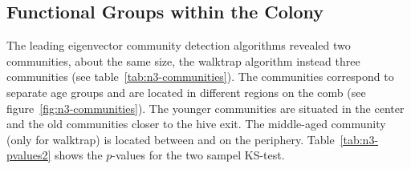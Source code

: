 \subsection{Functional Groups within the Colony}
The leading eigenvector community detection algorithms revealed two communities, about the same size, the walktrap algorithm instead three communities (see table~\ref{tab:n3-communities}).
The communities correspond to separate age groups and are located in different regions on the comb (see figure~\ref{fig:n3-communities}). The younger communities are situated in the center and the old communities closer to the hive exit. The middle-aged community (only for walktrap) is located between and on the periphery. Table~\ref{tab:n3-pvalues2} shows the $p$-values for the two sampel KS-test.




